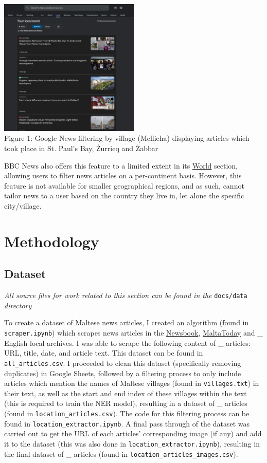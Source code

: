 \documentclass[a4paper, oneside, 11pt]{article}
\begin{document}
\begin{multicols*}{2}
  \begin{center}
    \includegraphics[width=0.5\textwidth]{./figures/googlenewsmellieha.png} \\
    Figure 1: Google News filtering by village (Mellieha) displaying articles which took place in St. Paul's Bay, Żurrieq and Żabbar
  \end{center}


  BBC News also offers this feature to a limited extent in its \href{https://www.bbc.com/news/world}{World} section, allowing users to filter news articles on a per-continent basis. However, this feature is not available for smaller geographical regions, and as such, cannot tailor news to a user based on the country they live in, let alone the specific city/village.


  \section{Methodology}
  \subsection{Dataset}
  \textit{All source files for work related to this section can be found in the} \verb|docs/data| \textit{directory}

  \medskip

  To create a dataset of Maltese news articles, I created an algorithm (found in \verb|scraper.ipynb|) which scrapes news articles in the \href{https://newsbook.com.mt/}{Newsbook}, \href{https://www.maltatoday.com.mt/}{MaltaToday} and _ English local archives. I was able to scrape the following content of _ articles: URL, title, date, and article text. This dataset can be found in \verb|all_articles.csv|. I proceeded to clean this dataset (specifically removing duplicates) in Google Sheets, followed by a filtering process to only include articles which mention the names of Maltese villages (found in \verb|villages.txt|) in their text, as well as the start and end index of these villages within the text (this is required to train the NER model), resulting in a dataset of _ articles (found in \verb|location_articles.csv|). The code for this filtering process can be found in \verb|location_extractor.ipynb|. A final pass through of the dataset was carried out to get the URL of each articles' corresponding image (if any) and add it to the dataset (this was also done in \verb|location_extractor.ipynb|), resulting in the final dataset of _ articles (found in \verb|location_articles_images.csv|).


\end{multicols*}
\end{document}
